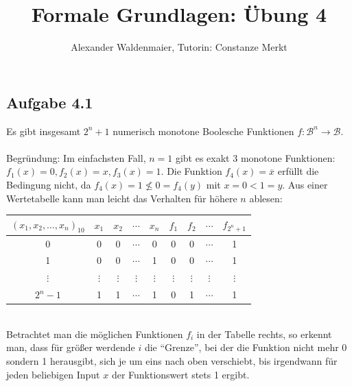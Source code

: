 \documentclass{article}
\title{Formale Grundlagen: Übung 4}
\author{Alexander Waldenmaier, Tutorin: Constanze Merkt}
\begin{document}
    \maketitle

    \subsection*{Aufgabe 4.1}
    Es gibt insgesamt $2^n+1$ numerisch monotone Boolesche Funktionen $f:\mathcal{B}^n \rightarrow \mathcal{B}$. \\\\
    Begründung: Im einfachsten Fall, $n=1$ gibt es exakt 3 monotone Funktionen: $f_1(x) = 0, f_2(x) = x, f_3(x) = 1$. Die Funktion $f_4(x) = \overline{x}$ erfüllt die Bedingung nicht, da $f_4(x)=1 \nleq 0=f_4(y)$ mit $x=0<1=y$. Aus einer Wertetabelle kann man leicht das Verhalten für höhere $n$ ablesen: 
    \begin{table}[h]
        \centering
        \begin{tabular}{c|cccc||cccc}
            $(x_1, x_2, \ldots, x_n)_{10}$ & $x_1$ & $x_2$ & $\cdots$ & $x_n$ & $f_1$ & $f_2$ & $\cdots$ & $f_{2^n+1}$\\ \hline
            0 & 0 & 0 & $\cdots$ & 0 & 0 & 0 & $\cdots$ & 1 \\
            1 & 0 & 0 & $\cdots$ & 1 & 0 & 0 & $\cdots$ & 1 \\
            $\vdots$ & $\vdots$ & $\vdots$ & $\vdots$ & $\vdots$ & $\vdots$ & $\vdots$ & $\vdots$ & $\vdots$ \\
            $2^n-1$ & 1 & 1 & $\cdots$ & 1 & 0 & 1 & $\cdots$ & 1 \\
        \end{tabular}
    \end{table}\\
    Betrachtet man die möglichen Funktionen $f_i$ in der Tabelle rechts, so erkennt man, dass für größer werdende $i$ die "`Grenze"', bei der die Funktion nicht mehr 0 sondern 1 herausgibt, sich je um eins nach oben verschiebt, bis irgendwann für jeden beliebigen Input $x$ der Funktionswert stets 1 ergibt. 
\end{document}
